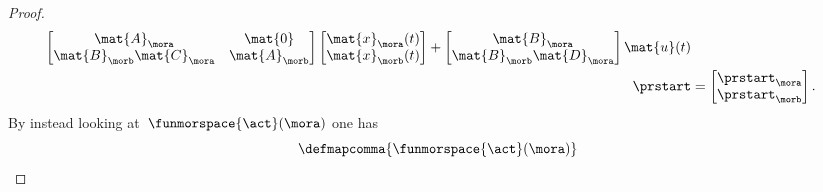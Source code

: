 \begin{proof}
\begin{equation}
\begin{aligned}
\begin{bmatrix}
                                                  \mat{A}_\mora              & \mat{0}       \\
                                                  \mat{B}_\morb\mat{C}_\mora & \mat{A}_\morb
                                              \end{bmatrix} \begin{bmatrix}
                                                                \mat{x}_\mora(t) \\
                                                                \mat{x}_\morb(t)
                                                            \end{bmatrix}+\begin{bmatrix}
                                                                              \mat{B}_\mora \\
                                                                              \mat{B}_\morb\mat{D}_\mora
                                                                          \end{bmatrix}\mat{u}(t) \\
            \prstart                                  & =
            \begin{bmatrix}
                \prstart_\mora \\
                \prstart_\morb
            \end{bmatrix}.
        \end{aligned}
    \end{equation}
    By instead looking at~$\funmorspace{\act}(\mora)$ one has
    \begin{equation*}
        \defmapcomma{\funmorspace{\act}(\mora)}

\end{equation*}
\end{proof}
